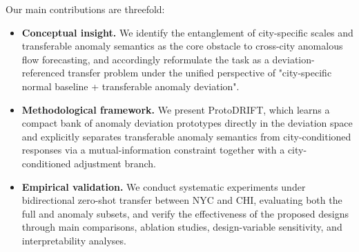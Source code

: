 Our main contributions are threefold:

\begin{itemize}
    \item \textbf{Conceptual insight.} We identify the entanglement of city-specific scales and transferable anomaly semantics as the core obstacle to cross-city anomalous flow forecasting, and accordingly reformulate the task as a deviation-referenced transfer problem under the unified perspective of "city-specific normal baseline + transferable anomaly deviation".
    \item \textbf{Methodological framework.} We present ProtoDRIFT, which learns a compact bank of anomaly deviation prototypes directly in the deviation space and explicitly separates transferable anomaly semantics from city-conditioned responses via a mutual-information constraint together with a city-conditioned adjustment branch.
    \item \textbf{Empirical validation.} We conduct systematic experiments under bidirectional zero-shot transfer between NYC and CHI, evaluating both the full and anomaly subsets, and verify the effectiveness of the proposed designs through main comparisons, ablation studies, design-variable sensitivity, and interpretability analyses.
\end{itemize}
